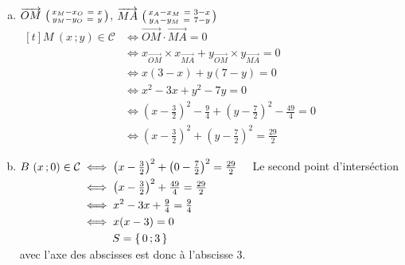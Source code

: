 \documentclass[12pt, a4paper]{article}
\begin{document}
	\pagebreak

	\begin{Exercise}[number={72}]
		\begin{enumerate}[a)]
			\item	$\overrightarrow{OM}\ \begin{psmallmatrix}x_M-x_O\ =& x \\ y_M-y_O\ =& y\end{psmallmatrix}$, \quad $\overrightarrow{MA}\ \begin{psmallmatrix}x_A-x_M\ =& 3-x \\ y_A-y_M\ =& 7-y\end{psmallmatrix}$ \smallbreak $\begin{aligned}[t]
						M\ (x\,;y)\in\mathcal{C}&\iff\overrightarrow{OM}\cdot\overrightarrow{MA}=0 &\\
						&\iff x_{\overrightarrow{OM}}\times x_{\overrightarrow{MA}}+y_{\overrightarrow{OM}}\times y_{\overrightarrow{MA}}=0 &\\
						&\iff x(3-x)+y(7-y)=0 &\\
						&\iff x^2-3x+y^2-7y=0 &\\
						&\iff \left(x-\tfrac{3}{2}\right)^2-\tfrac{9}{4}+\left(y-\tfrac{7}{2}\right)^2-\tfrac{49}{4}=0 &\\
						&\iff \left(x-\tfrac{3}{2}\right)^2+\left(y-\tfrac{7}{2}\right)^2=\tfrac{29}{2}
					\end{aligned}$ \medbreak
			\item 	$\begin{aligned}[t]
						B\ (x\,;0)\in\mathcal{C}&\iff\left(x-\tfrac{3}{2}\right)^2+\left(0-\tfrac{7}{2}\right)^2=\tfrac{29}{2} &\\
						&\iff \left(x-\tfrac{3}{2}\right)^2+\tfrac{49}{4}=\tfrac{29}{2} &\\
						&\iff x^2-3x+\tfrac{9}{4}=\tfrac{9}{4} &\\
						&\iff x(x-3)=0 &\\
						&\hphantom{\iff}\ \, S=\left\{\,0\,;3\,\right\}
					\end{aligned}$ \smallbreak Le second point d'interséction avec l'axe des abscisses est donc à l'abscisse 3.
		\end{enumerate}
	\end{Exercise}
\end{document}

